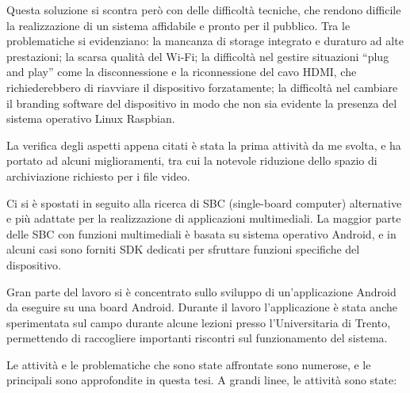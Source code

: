 Questa soluzione si scontra però con delle difficoltà tecniche, che rendono difficile la realizzazione di un sistema affidabile e pronto per il pubblico. Tra le problematiche si evidenziano: la mancanza di storage integrato e duraturo ad alte prestazioni; la scarsa qualità del Wi-Fi; la difficoltà nel gestire situazioni “plug and play” come la disconnessione e la riconnessione del cavo HDMI, che richiederebbero di riavviare il dispositivo forzatamente; la difficoltà nel cambiare il branding software del dispositivo in modo che non sia evidente la presenza del sistema operativo Linux Raspbian.

La verifica degli aspetti appena citati è stata la prima attività da me svolta, e ha portato ad alcuni miglioramenti, tra cui la notevole riduzione dello spazio di archiviazione richiesto per i file video.

Ci si è spostati in seguito alla ricerca di SBC (single-board computer) alternative e più adattate per la realizzazione di applicazioni multimediali. La maggior parte delle SBC con funzioni multimediali è basata su sistema operativo Android, e in alcuni casi sono forniti SDK dedicati per sfruttare funzioni specifiche del dispositivo.

Gran parte del lavoro si è concentrato sullo sviluppo di un'applicazione Android da eseguire su una board Android. Durante il lavoro l'applicazione è stata anche sperimentata sul campo durante alcune lezioni presso l'Universitaria di Trento, permettendo di raccogliere importanti riscontri sul funzionamento del sistema.

Le attività e le problematiche che sono state affrontate sono numerose, e le principali sono approfondite in questa tesi. A grandi linee, le attività sono state:


